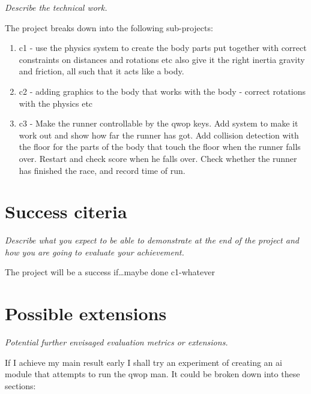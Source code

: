 \documentclass[12pt,a4paper,twoside]{article}
\begin{document}
\emph{Describe the technical work.}

The project breaks down into the following sub-projects:

\begin{enumerate}

Major work items/substance: core/extension


\item c1 - use the physics system to create the body parts put together with correct constraints on distances and rotations etc also give it the right inertia gravity and friction, all such that it acts like a body.

\item c2 - adding graphics to the body that works with the body - correct rotations with the physics etc

\item c3 - Make the runner controllable by the qwop keys. Add system to make it work out and show how far the runner has got. Add collision detection with the floor for the parts of the body that touch the floor when the runner falls over. Restart and check score when he falls over. Check whether the runner has finished the race, and record time of run.


\end{enumerate}

\section*{Success citeria}

\emph{Describe what you expect to be able to demonstrate at the end of the project and how you are going to evaluate your achievement.}


The project will be a success if\ldots maybe done c1-whatever


\section*{Possible extensions}

{\em Potential further envisaged evaluation metrics or extensions.}

If I achieve my main result early I shall try an experiment of creating an ai module that attempts to run the qwop man. It could be broken down into these sections:
\end{document}
